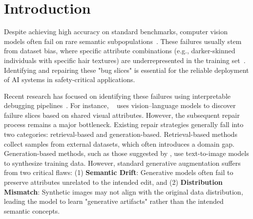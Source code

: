 \begin{abstract}
Deep learning models for visual recognition often exhibit systematic errors due to underrepresented semantic subpopulations. While existing debugging frameworks can identify these failure slices, effectively repairing them remains difficult. Current solutions often rely on manually designed prompts to generate synthetic images—an approach that introduces distribution shift and semantic errors, often creating new bugs. To address these issues, we introduce \model, a framework for distribution-consistent model repair via controlled  generation. Our approach employs a structural-conditioned diffusion model to generate semantically faithful images that modify only specific failure attributes while preserving the underlying data distribution. To ensure the reliability of the repair data, we implement a  verification mechanism using a large vision--language model (LVLM) to enforce semantic consistency and label preservation. By retraining models on the synthetic data, we significantly reduce errors in rare cases and improve overall performance. Our experiments show that \model achieves superior robustness by maintaining high precision in attribute editing without introducing additional bugs.
\end{abstract}

\section{Introduction}
Despite achieving high accuracy on standard benchmarks, computer vision models often fail on rare semantic subpopulations~\cite{barbu2019objectnet,gao2023adaptive,leclerc20223db}. These failures usually stem from dataset bias, where specific attribute combinations (e.g., darker-skinned individuals with specific hair textures) are underrepresented in the training set~\cite{buolamwini2018gender}. Identifying and repairing these "bug slices" is essential for the reliable deployment of AI systems in safety-critical applications.

Recent research has focused on identifying these failures using interpretable debugging pipelines~\cite{gao2023adaptive,chen2023hibug,singla2024data}. For instance, \hibug~\cite{chen2023hibug} uses vision--language models to discover failure slices based on shared visual attributes. However, the subsequent repair process remains a major bottleneck. Existing repair strategies generally fall into two categories: retrieval-based and generation-based. Retrieval-based methods~\cite{gao2023adaptive,singla2024data} collect samples from external datasets, which often introduces a domain gap. Generation-based methods, such as those suggested by \hibug, use text-to-image models to synthesize training data. However, standard generative augmentation suffers from two critical flaws: (1) \textbf{Semantic Drift}: Generative models often fail to preserve attributes unrelated to the intended edit, and (2) \textbf{Distribution Mismatch}: Synthetic images may not align with the original data distribution, leading the model to learn "generative artifacts" rather than the intended semantic concepts.

